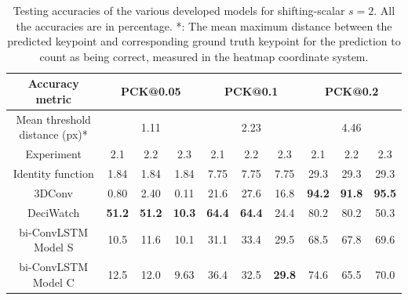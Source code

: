\documentclass[./main.tex]{subfiles}
\begin{document}
\begin{table}[htbp]
    \begin{tabular}{c||ccc|ccc|ccc}
        \hline
        Accuracy metric & \multicolumn{3}{c}{PCK@0.05} & \multicolumn{3}{c}{PCK@0.1} & \multicolumn{3}{c}{PCK@0.2} \\
        \hline
        Mean threshold distance (px)* & \multicolumn{3}{c}{1.11} & \multicolumn{3}{c}{2.23} & \multicolumn{3}{c}{4.46} \\
        \hline
        Experiment & 2.1 & 2.2 & 2.3 & 2.1 & 2.2 & 2.3 & 2.1 & 2.2 & 2.3 \\
        \hline
        \hline
        Identity function & 1.84 & 1.84 & 1.84 & 7.75 & 7.75 & 7.75 & 29.3 & 29.3 & 29.3 \\
        3DConv & 0.80 & 2.40 & 0.11 & 21.6 & 27.6 & 16.8 & \textbf{94.2} & \textbf{91.8} & \textbf{95.5} \\
        DeciWatch & \textbf{51.2} & \textbf{51.2} & \textbf{10.3} & \textbf{64.4} & \textbf{64.4} & 24.4 & 80.2 & 80.2 & 50.3 \\
        bi-ConvLSTM Model S & 10.5 & 11.6 & 10.1 & 31.1 & 33.4 & 29.5 & 68.5 & 67.8 & 69.6 \\
        bi-ConvLSTM Model C & 12.5 & 12.0 & 9.63 & 36.4 & 32.5 & \textbf{29.8} & 74.6 & 65.5 & 70.0 \\
        \hline
    \end{tabular}
    \caption{Testing accuracies of the various developed models for shifting-scalar $s = 2$. All the accuracies are in percentage. *: The mean maximum distance between the predicted keypoint and corresponding ground truth keypoint for the prediction to count as being correct, measured in the heatmap coordinate system.}
    \label{tab:pretrain_test_accs_2}
\end{table}
\end{document}
